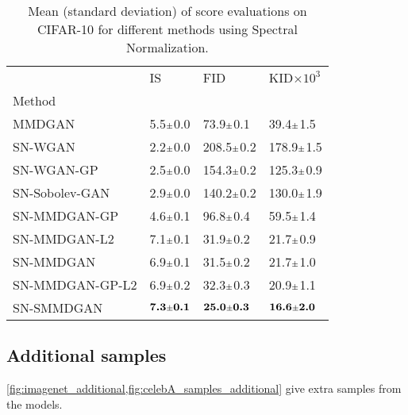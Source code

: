 \documentclass{article}
\begin{document}
\begin{table}[ht]
    \centering
 \caption{Mean (standard deviation) of score evaluations on CIFAR-10 for different methods using Spectral Normalization.}
    \label{tab:sn_cifar10_scores}
  \begin{tabular}{llll}
\toprule
{} &                                    IS &                                    FID &                       KID$\times 10^3$ \\
Method          &                                       &                                        &                                        \\
\midrule
MMDGAN          &             5.5$\mathsmaller{\pm}$0.0 &             73.9$\mathsmaller{\pm}$0.1 &             39.4$\mathsmaller{\pm}$1.5 \\
SN-WGAN         &             2.2$\mathsmaller{\pm}$0.0 &            208.5$\mathsmaller{\pm}$0.2 &            178.9$\mathsmaller{\pm}$1.5 \\
SN-WGAN-GP      &             2.5$\mathsmaller{\pm}$0.0 &            154.3$\mathsmaller{\pm}$0.2 &            125.3$\mathsmaller{\pm}$0.9 \\
SN-Sobolev-GAN  &             2.9$\mathsmaller{\pm}$0.0 &            140.2$\mathsmaller{\pm}$0.2 &            130.0$\mathsmaller{\pm}$1.9 \\
SN-MMDGAN-GP    &             4.6$\mathsmaller{\pm}$0.1 &             96.8$\mathsmaller{\pm}$0.4 &             59.5$\mathsmaller{\pm}$1.4 \\
SN-MMDGAN-L2    &             7.1$\mathsmaller{\pm}$0.1 &             31.9$\mathsmaller{\pm}$0.2 &             21.7$\mathsmaller{\pm}$0.9 \\
SN-MMDGAN       &             6.9$\mathsmaller{\pm}$0.1 &             31.5$\mathsmaller{\pm}$0.2 &             21.7$\mathsmaller{\pm}$1.0 \\
SN-MMDGAN-GP-L2 &             6.9$\mathsmaller{\pm}$0.2 &             32.3$\mathsmaller{\pm}$0.3 &             20.9$\mathsmaller{\pm}$1.1 \\
SN-SMMDGAN      &  $\textbf{7.3$\mathsmaller{\pm}$0.1}$ &  $\textbf{25.0$\mathsmaller{\pm}$0.3}$ &  $\textbf{16.6$\mathsmaller{\pm}$2.0}$ \\
\bottomrule
\end{tabular}
 \end{table}



\subsection{Additional samples} \label{appendix:additional-samples}
\cref{fig:imagenet_additional,fig:celebA_samples_additional} give extra samples from the models.
\end{document}
